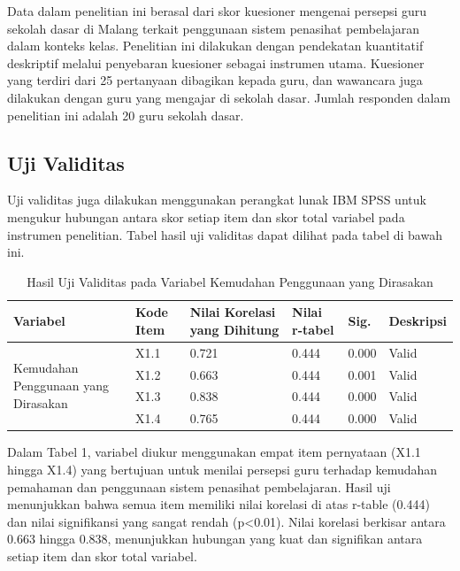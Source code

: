     Data dalam penelitian ini berasal dari skor kuesioner mengenai persepsi guru sekolah dasar di Malang terkait penggunaan sistem penasihat pembelajaran dalam konteks kelas. Penelitian ini dilakukan dengan pendekatan kuantitatif deskriptif melalui penyebaran kuesioner sebagai instrumen utama. Kuesioner yang terdiri dari 25 pertanyaan dibagikan kepada guru, dan wawancara juga dilakukan dengan guru yang mengajar di sekolah dasar. Jumlah responden dalam penelitian ini adalah 20 guru sekolah dasar.

\subsection{Uji Validitas}

    Uji validitas juga dilakukan menggunakan perangkat lunak IBM SPSS untuk mengukur hubungan antara skor setiap item dan skor total variabel pada instrumen penelitian. Tabel hasil uji validitas dapat dilihat pada tabel di bawah ini.

    \begin{table}[H]
        \centering
        \caption{Hasil Uji Validitas pada Variabel Kemudahan Penggunaan yang Dirasakan}
        \label{tab:uji-validitas-kemudahan}
        \begin{tabularx}{\textwidth}{p{4.5cm}lXXXl}
            \toprule
            \textbf{Variabel} & \textbf{Kode Item} & \textbf{Nilai Korelasi yang Dihitung} & \textbf{Nilai r-tabel} & \textbf{Sig.} & \textbf{Deskripsi} \\
            \midrule
            \multirow{4}{=}{Kemudahan Penggunaan yang Dirasakan}
                & X1.1 & 0.721 & 0.444 & 0.000 & Valid \\
                & X1.2 & 0.663 & 0.444 & 0.001 & Valid \\
                & X1.3 & 0.838 & 0.444 & 0.000 & Valid \\
                & X1.4 & 0.765 & 0.444 & 0.000 & Valid \\
            \bottomrule
        \end{tabularx}
    \end{table}

    Dalam Tabel 1, variabel diukur menggunakan empat item pernyataan (X1.1 hingga X1.4) yang bertujuan untuk menilai persepsi guru terhadap kemudahan pemahaman dan penggunaan sistem penasihat pembelajaran. Hasil uji menunjukkan bahwa semua item memiliki nilai korelasi di atas r-table (0.444) dan nilai signifikansi yang sangat rendah (p<0.01). Nilai korelasi berkisar antara 0.663 hingga 0.838, menunjukkan hubungan yang kuat dan signifikan antara setiap item dan skor total variabel.

